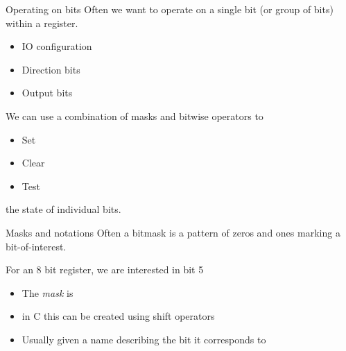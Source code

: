 \documentclass[svgnames,x11names]{beamer}
\begin{document}
\begin{frame}{Operating on bits}
Often we want to operate on a single bit (or group of bits) within a register.
\begin{itemize}
\item IO configuration
\item Direction bits
\item Output bits
\end{itemize}

\pause
We can use a combination of \alert{masks} and \alert{bitwise operators} to
\begin{itemize}
\item Set
\item Clear
\item Test
\end{itemize}
the state of individual bits.
\end{frame}

\begin{frame}[fragile]{Masks and notations}
Often a \alert{bitmask} is a pattern of zeros and ones marking a bit-of-interest.

\begin{example}
  For an \alert{8} bit register, we are interested in bit 5\\[1ex]
  \begin{itemize}
  \item The \emph{mask} is

\item in C this can be created using \alert{shift} operators
\item Usually given a name describing the bit it corresponds to
  \end{itemize}
\end{example}
\end{frame}
\end{document}
